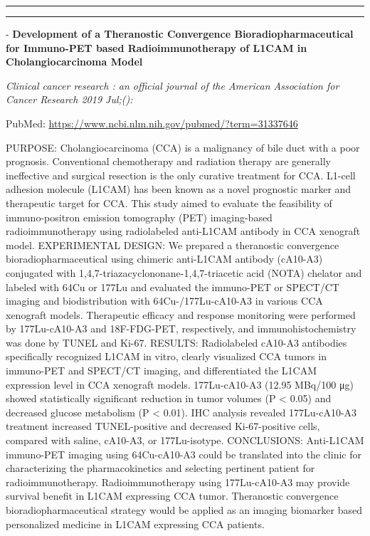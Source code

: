 \documentclass[]{article}
\begin{document}
\begin{center}\rule{0.5\linewidth}{\linethickness}\end{center}

\begin{center}\rule{0.5\linewidth}{\linethickness}\end{center}

 - \textbf{Development of a Theranostic Convergence
Bioradiopharmaceutical for Immuno-PET based Radioimmunotherapy of L1CAM
in Cholangiocarcinoma Model}

\emph{Clinical cancer research : an official journal of the American
Association for Cancer Research 2019 Jul;():}

PubMed: \url{https://www.ncbi.nlm.nih.gov/pubmed/?term=31337646}

PURPOSE: Cholangiocarcinoma (CCA) is a malignancy of bile duct with a
poor prognosis. Conventional chemotherapy and radiation therapy are
generally ineffective and surgical resection is the only curative
treatment for CCA. L1-cell adhesion molecule (L1CAM) has been known as a
novel prognostic marker and therapeutic target for CCA. This study aimed
to evaluate the feasibility of immuno-positron emission tomography (PET)
imaging-based radioimmunotherapy using radiolabeled anti-L1CAM antibody
in CCA xenograft model. EXPERIMENTAL DESIGN: We prepared a theranostic
convergence bioradiopharmaceutical using chimeric anti-L1CAM antibody
(cA10-A3) conjugated with 1,4,7-triazacyclononane-1,4,7-triacetic acid
(NOTA) chelator and labeled with 64Cu or 177Lu and evaluated the
immuno-PET or SPECT/CT imaging and biodistribution with
64Cu-/177Lu-cA10-A3 in various CCA xenograft models. Therapeutic
efficacy and response monitoring were performed by 177Lu-cA10-A3 and
18F-FDG-PET, respectively, and immunohistochemistry was done by TUNEL
and Ki-67. RESULTS: Radiolabeled cA10-A3 antibodies specifically
recognized L1CAM in vitro, clearly visualized CCA tumors in immuno-PET
and SPECT/CT imaging, and differentiated the L1CAM expression level in
CCA xenograft models. 177Lu-cA10-A3 (12.95 MBq/100 μg) showed
statistically significant reduction in tumor volumes (P \textless{}
0.05) and decreased glucose metabolism (P \textless{} 0.01). IHC
analysis revealed 177Lu-cA10-A3 treatment increased TUNEL-positive and
decreased Ki-67-positive cells, compared with saline, cA10-A3, or
177Lu-isotype. CONCLUSIONS: Anti-L1CAM immuno-PET imaging using
64Cu-cA10-A3 could be translated into the clinic for characterizing the
pharmacokinetics and selecting pertinent patient for radioimmunotherapy.
Radioimmunotherapy using 177Lu-cA10-A3 may provide survival benefit in
L1CAM expressing CCA tumor. Theranostic convergence
bioradiopharmaceutical strategy would be applied as an imaging biomarker
based personalized medicine in L1CAM expressing CCA patients.
\end{document}
